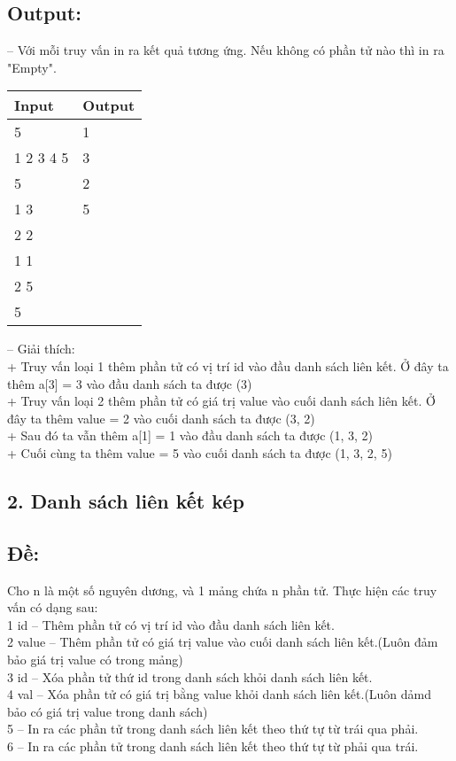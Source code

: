 \subsection*{Output:}
-- Với mỗi truy vấn in ra kết quả tương ứng. Nếu không có phần tử nào thì in ra "Empty".\\

\begin{table}[h!]
\centering
\begin{tabularx}{0.8\textwidth}{|X|X|}
\hline
\textbf{Input} & \textbf{Output} \\
\hline
5 & 1 \\
1 2 3 4 5& 3\\
5& 2\\
1 3& 5\\
2 2&\\
1 1&\\
2 5&\\
5&\\
\hline
\end{tabularx}
\end{table}
-- Giải thích:\\
+ Truy vấn loại 1 thêm phần tử có vị trí id vào đầu danh sách liên kết. Ở đây ta thêm a[3] = 3 vào đầu danh sách ta được (3)\\
+ Truy vấn loại 2 thêm phần tử có giá trị value vào cuối danh sách liên kết. Ở đây ta thêm value = 2 vào cuối danh sách ta được (3, 2)\\
+ Sau đó ta vẫn thêm a[1] = 1 vào đầu danh sách ta được (1, 3, 2)\\
+ Cuối cùng ta thêm value = 5 vào cuối danh sách ta được (1, 3, 2, 5)
\subsection*{2. Danh sách liên kết kép}
\subsection*{Đề:}
Cho n là một số nguyên dương, và 1 mảng chứa n phần tử. Thực hiện các truy vấn có dạng sau:\\
1 id -- Thêm phần tử có vị trí id vào đầu danh sách liên kết.\\
2 value -- Thêm phần tử có giá trị value vào cuối danh sách liên kết.(Luôn đảm bảo giá trị value có trong mảng)\\
3 id -- Xóa phần tử thứ id trong danh sách khỏi danh sách liên kết.\\
4 val -- Xóa phần tử có giá trị bằng value khỏi danh sách liên kết.(Luôn dảmd bảo có giá trị value trong danh sách)\\
5 -- In ra các phần tử trong danh sách liên kết theo thứ tự từ trái qua phải.\\
6 -- In ra các phần tử trong danh sách liên kết theo thứ tự từ phải qua trái.\\
\vspace{-1.em}
